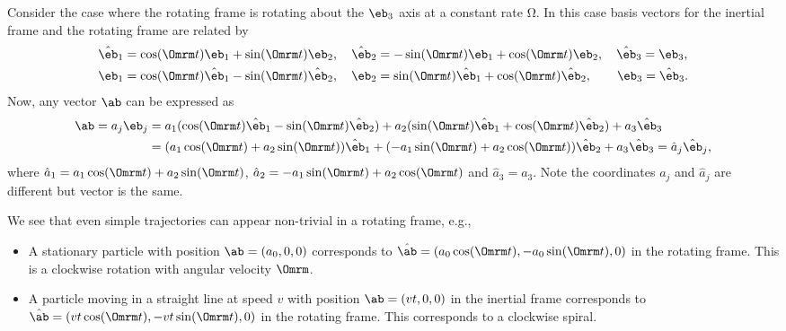 \documentclass[
  letterpaper,
  twocolumn,
  landscape]{report}
\providecommand{\tightlist}{%
  \setlength{\itemsep}{0pt}\setlength{\parskip}{0pt}}\usepackage{longtable,booktabs,array}
\begin{document}
\begin{tcolorbox}[enhanced jigsaw, left=2mm, opacityback=0, coltitle=black, bottomtitle=1mm, title={Example}, toprule=.15mm, colbacktitle=quarto-callout-tip-color!10!white, breakable, arc=.35mm, titlerule=0mm, colback=white, toptitle=1mm, opacitybacktitle=0.6, rightrule=.15mm, bottomrule=.15mm, colframe=quarto-callout-tip-color-frame, leftrule=.75mm]

Consider the case where the rotating frame is rotating about the
\(\eb_3\) axis at a constant rate \(\mathrm{\Omega}\). In this case
basis vectors for the inertial frame and the rotating frame are related
by \begin{align*}
\hat\eb_1 &= \cos(\Omrm t)\eb_1 + \sin(\Omrm t)\eb_2, \quad \hat\eb_2 = -\sin(\Omrm t)\eb_1 + \cos(\Omrm t)\eb_2, \quad \hat\eb_3 = \eb_3,\\
\eb_1 &= \cos(\Omrm t)\hat\eb_1 - \sin(\Omrm t)\hat\eb_2, \quad \eb_2 = \sin(\Omrm t)\hat\eb_1 + \cos(\Omrm t)\hat\eb_2, \quad\quad \eb_3 = \hat\eb_3.
\end{align*} Now, any vector \(\ab\) can be expressed as \begin{align*}
\ab = a_j\eb_j &= a_1(\cos(\Omrm t)\hat\eb_1 - \sin(\Omrm t)\hat\eb_2) + a_2(\sin(\Omrm t)\hat\eb_1 + \cos(\Omrm t)\hat\eb_2) + a_3\hat\eb_3\\
& = (a_1\cos(\Omrm t) + a_2\sin(\Omrm t))\hat \eb_1 + (-a_1\sin(\Omrm t) + a_2\cos(\Omrm t))\hat \eb_2 + a_3\hat\eb_3 = \hat a_j \hat\eb_j,
\end{align*} where \(\hat a_1 = a_1\cos(\Omrm t) + a_2\sin(\Omrm t)\),
\(\hat a_2 = -a_1\sin(\Omrm t) + a_2\cos(\Omrm t)\) and
\(\hat a_3=a_3\). Note the coordinates \(a_j\) and \(\hat a_j\) are
different but vector is the same.

We see that even simple trajectories can appear non-trivial in a
rotating frame, e.g.,

\begin{itemize}
\tightlist
\item
  A stationary particle with position \(\ab=(a_0,0,0)\) corresponds to
  \(\hat\ab=(a_0\cos(\Omrm t), -a_0\sin(\Omrm t),0)\) in the rotating
  frame. This is a clockwise rotation with angular velocity \(\Omrm\).
\item
  A particle moving in a straight line at speed \(v\) with position
  \(\ab=(vt,0,0)\) in the inertial frame corresponds to
  \(\hat\ab=(vt\cos(\Omrm t), -vt\sin(\Omrm t),0)\) in the rotating
  frame. This corresponds to a clockwise spiral.
\end{itemize}


\end{tcolorbox}
\end{document}
